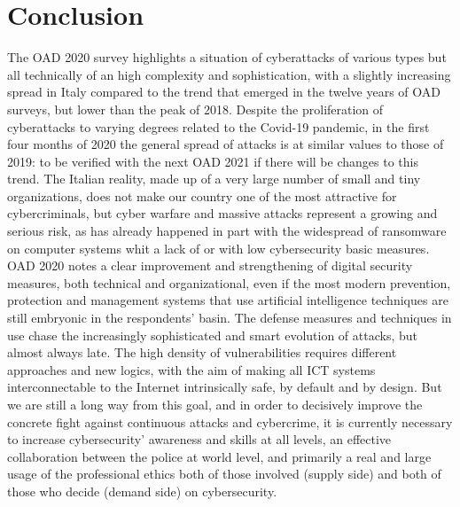 \documentclass{easychair}
\begin{document}
\section{Conclusion}\label{sec:Conclusion}

The OAD 2020 survey highlights a situation of cyberattacks of various types but all technically of an high complexity and sophistication, with a slightly increasing 
spread  in Italy  compared to the trend that emerged in the twelve years of OAD surveys, but lower than the peak of 2018. Despite the proliferation of cyberattacks to varying 
degrees related to the Covid-19 pandemic, in the first four months of 2020 the general spread of attacks is at similar values to those of 2019: to be verified with the next OAD 2021
if there will be changes to this trend. The Italian reality, made up of a very large number of small and tiny organizations, does not make our country one of the most attractive for cybercriminals, but cyber warfare
and massive attacks represent a growing and serious risk, as has already happened in part with the widespread of ransomware on computer systems whit a lack of or  with low 
cybersecurity  basic measures. OAD 2020 notes a clear improvement and strengthening of digital security measures, both technical and organizational, even if the most modern 
prevention, protection and management systems that use artificial intelligence techniques are still embryonic  in the respondents' basin. The defense measures and techniques 
in use chase the increasingly sophisticated and smart evolution of attacks, but almost always late. The high density of vulnerabilities 
requires different approaches and new logics, with the aim of making all ICT systems interconnectable to the Internet intrinsically safe, by default and by design. But we are 
still a long way from this goal, and in order to decisively improve the concrete fight against continuous attacks and cybercrime, it is currently necessary to increase 
cybersecurity’ awareness and skills at all levels, an effective collaboration between the police at world level, and primarily a real and large usage of the professional ethics
 both of those involved (supply side) and both of those who decide (demand side) on cybersecurity.



\end{document}
